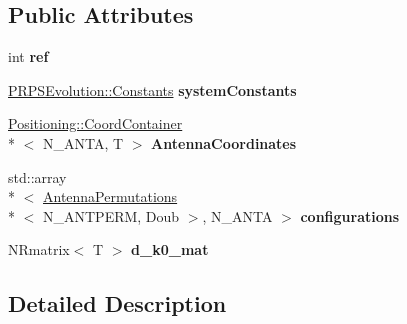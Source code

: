 \subsection*{Public Attributes}
\begin{DoxyCompactItemize}
\item 
\hypertarget{struct_p_r_p_s_evolution_1_1_permutate_1_1permute_antennas_a21e29b21d0c2cc612a06857da0127621}{int {\bfseries ref}}\label{struct_p_r_p_s_evolution_1_1_permutate_1_1permute_antennas_a21e29b21d0c2cc612a06857da0127621}

\item 
\hypertarget{struct_p_r_p_s_evolution_1_1_permutate_1_1permute_antennas_a85d40e6357f5cff5265a2899392cd865}{\hyperlink{struct_p_r_p_s_evolution_1_1_constants}{P\-R\-P\-S\-Evolution\-::\-Constants} {\bfseries system\-Constants}}\label{struct_p_r_p_s_evolution_1_1_permutate_1_1permute_antennas_a85d40e6357f5cff5265a2899392cd865}

\item 
\hypertarget{struct_p_r_p_s_evolution_1_1_permutate_1_1permute_antennas_a56226c0c761aaa257d0eaa701b19c835}{\hyperlink{struct_p_r_p_s_evolution_1_1_positioning_1_1_coord_container}{Positioning\-::\-Coord\-Container}\\*
$<$ N\-\_\-\-A\-N\-T\-A, T $>$ {\bfseries Antenna\-Coordinates}}\label{struct_p_r_p_s_evolution_1_1_permutate_1_1permute_antennas_a56226c0c761aaa257d0eaa701b19c835}

\item 
\hypertarget{struct_p_r_p_s_evolution_1_1_permutate_1_1permute_antennas_a98128f0b9e99559dc537c67b200ec18c}{std\-::array\\*
$<$ \hyperlink{struct_p_r_p_s_evolution_1_1_permutate_1_1_antenna_permutations}{Antenna\-Permutations}\\*
$<$ N\-\_\-\-A\-N\-T\-P\-E\-R\-M, Doub $>$, N\-\_\-\-A\-N\-T\-A $>$ {\bfseries configurations}}\label{struct_p_r_p_s_evolution_1_1_permutate_1_1permute_antennas_a98128f0b9e99559dc537c67b200ec18c}

\item 
\hypertarget{struct_p_r_p_s_evolution_1_1_permutate_1_1permute_antennas_a255cd80ec5b4dfb6c2c318df1e052c80}{N\-Rmatrix$<$ T $>$ {\bfseries d\-\_\-k0\-\_\-mat}}\label{struct_p_r_p_s_evolution_1_1_permutate_1_1permute_antennas_a255cd80ec5b4dfb6c2c318df1e052c80}

\end{DoxyCompactItemize}


\subsection{Detailed Description}
